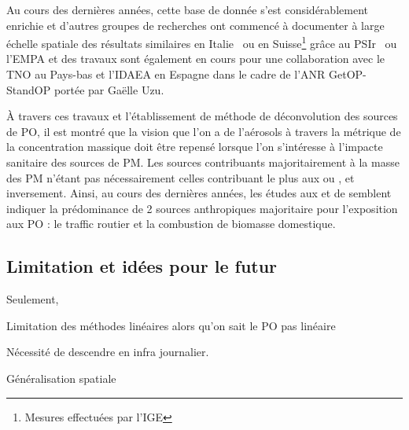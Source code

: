 Au cours des dernières années, cette base de donnée s'est considérablement enrichie et
d'autres groupes de recherches ont commencé à documenter à large échelle spatiale des
résultats similaires en Italie~\autocite{pietrograndeReview2019} ou en
Suisse\footnote{Mesures effectuées par l'IGE} grâce au
PSIr~\autocite{daellenbachSourcessubmitted} ou l'EMPA et des travaux sont également en
cours pour une collaboration avec le TNO au Pays-bas et l'IDAEA en Espagne dans le cadre
de l'ANR GetOP-StandOP portée par Gaëlle Uzu.

À travers ces travaux et l'établissement de méthode de déconvolution des sources de PO, il
est montré que la vision que l'on a de l'aérosols à travers la métrique de la
concentration massique doit être repensé lorsque l'on s'intéresse à l'impacte sanitaire
des sources de PM. Les sources contribuants majoritairement à la masse des PM n'étant pas
nécessairement celles contribuant le plus aux \POAA{} ou \PODTT, et inversement.
Ainsi, au cours des dernières années, les études aux \POAA{} et \PODTT{} de
\cite{vermaReactive2014,batesReactive2015,fangOxidative2016,weberApportionment2018,cesariSource2019,daellenbachSourcessubmitted,weberSourceinprep.}
semblent indiquer la prédominance de 2 sources anthropiques majoritaire pour l'exposition
aux PO : le traffic routier et la combustion de biomasse domestique.

\subsection{Limitation et idées pour le futur}%
\label{sub:limitation_et_idées_pour_le_futur}

Seulement, 


Limitation des méthodes linéaires alors qu'on sait le PO pas linéaire

Nécessité de descendre en infra journalier.

Généralisation spatiale

